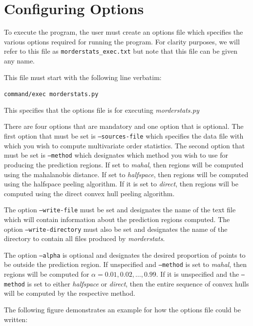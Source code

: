 \documentclass[11pt]{article}
\begin{document}
\section{Configuring Options}

To execute the program, the user must create an options file which specifies the various options required for running the program. For clarity purposes, we will refer to this file as \texttt{morderstats\_exec.txt} but note that this file can be given any name.

This file must start with the following line verbatim:
\begin{center}
	\texttt{command/exec morderstats.py}
\end{center}
This specifies that the options file is for executing \textit{morderstats.py}

There are four options that are mandatory and one option that is optional.
The first option that must be set is \texttt{--sources-file} which specifies the data file with which you wish to compute multivariate order statistics.
The second option that must be set is \texttt{--method} which designates which method you wish to use for producing the prediction regions.
If set to \textit{mahal}, then regions will be computed using the mahalanobis distance.
If set to \textit{halfspace}, then regions will be computed using the halfspace peeling algorithm.
If it is set to \textit{direct}, then regions will be computed using the direct convex hull peeling algorithm.

The option \texttt{--write-file} must be set and designates the name of the text file which will contain information about the prediction regions computed.
The option \texttt{--write-directory} must also be set and designates the name of the directory to contain all files produced by \textit{morderstats}.

The option \texttt{--alpha} is optional and designates the desired proportion of points to be outside the prediction region. If unspecified and \texttt{--method} is set to \textit{mahal}, then regions will be computed for $\alpha = 0.01,0.02,\ldots,0.99$. If it is unspecified and the \texttt{--method} is set to either \textit{halfspace} or \textit{direct}, then the entire sequence of convex hulls will be computed by the respective method.

The following figure demonstrates an example for how the options file could be written:

\begin{framed}
	
\end{framed}
\end{document}
